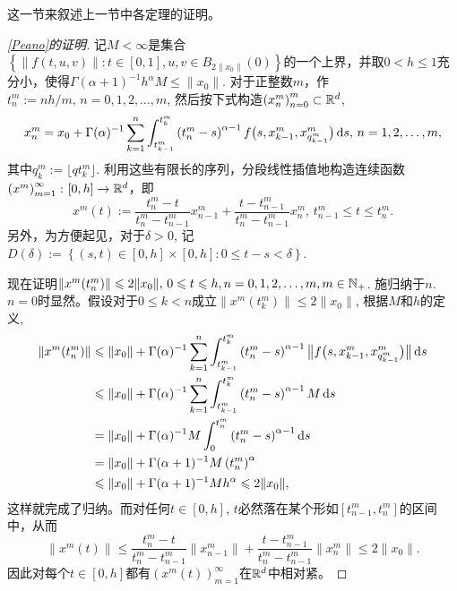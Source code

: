 这一节来叙述上一节中各定理的证明。
\begin{proof}[\cref{Peano}的证明]
    记$M<\infty$是集合$\left\{\left\|f(t,u,v)\right\|\colon t\in [0,1], u,v\in B_{2\|x_0\|}(0)\right\}$的一个上界，并取$0<h\leqslant 1$充分小，使得$\Gamma(\alpha + 1)^{-1} h^\alpha M \leqslant \|x_0\|$. 对于正整数$m$，作$t^m_{n}:=nh/m,\,n=0,1,2,\dots,m$, 然后按下式构造$\left(x^m_{n}\right)_{n=0}^m\subset \mathbb{R}^d$,
    \begin{equation*}
        x^m_{n}=x_0+\Gamma(\alpha)^{-1}\sum_{k=1}^n\int_{t^m_{k-1}}^{t^m_k}\left(t^m_n-s\right)^{\alpha-1}f\bigl(s,x^m_{k-1},x^m_{q^m_{k-1}}\bigr)\mathop{}\!\mathrm{d} s,\,n=1,2,\dots,m,
    \end{equation*}
    其中$q^m_{k}:=\lfloor qt^m_k \rfloor$. 利用这些有限长的序列，分段线性插值地构造连续函数$\left(x^m\right)_{m=1}^\infty\colon[0,h]\to \mathbb{R}^d$，即
    \begin{equation*}
        x^m(t):=\frac{t^m_n-t}{t^m_n-t^m_{n-1}}x^m_{n-1}+\frac{t-t^m_{n-1}}{t^m_n-t^m_{n-1}}x^m_{n},\,t^m_{n-1}\leqslant t\leqslant t^m_n.
    \end{equation*}
    另外，为方便起见，对于$\delta>0$, 记$D(\delta):=\left\{(s,t)\in [0,h]\times [0,h]\colon 0\leqslant t-s<\delta\right\}$.

    现在证明$\|x^m(t^m_n)\|\leqslant 2\|x_0\|,\,0\leqslant t\leqslant h,n=0,1,2,\dots,m,m\in \mathbb{N_+}$. 施归纳于$n$. $n=0$时显然。假设对于$0\leqslant k<n$成立$\|x^m(t^m_k)\|\leqslant 2\|x_0\|$, 根据$M$和$h$的定义,
    \begin{align*}
        \left\|x^m(t^m_n)\right\|&\leqslant \|x_0\|+\Gamma(\alpha)^{-1}\sum_{k=1}^{n}\int_{t^m_{k-1}}^{t^m_k} \left(t^m_n-s\right)^{\alpha-1} \bigl\|f\bigl(s,x^m_{k-1},x^m_{q^m_{k-1}}\bigr)\bigr\| \mathop{}\!\mathrm{d} s
        \\ &\leqslant \|x_0\|+\Gamma(\alpha)^{-1} \sum_{k=1}^{n}\int_{t^m_{k-1}}^{t^m_k} \left(t^m_n-s\right)^{\alpha-1} M \mathop{}\!\mathrm{d} s
        \\ &= \|x_0\|+\Gamma(\alpha)^{-1} M \int_{0}^{t^m_n} \left(t^m_n-s\right)^{\alpha-1} \mathop{}\!\mathrm{d} s
        \\ &= \|x_0\|+\Gamma(\alpha+1)^{-1} M \left(t^m_n\right)^\alpha
        \\ &\leqslant \|x_0\|+\Gamma(\alpha+1)^{-1} M h^\alpha
        \leqslant 2\|x_0\|,
    \end{align*}
    这样就完成了归纳。而对任何$t\in [0,h]$, $t$必然落在某个形如$\left[t^m_{n-1},t^m_n\right]$的区间中，从而
    \begin{equation*}
        \left\|x^m(t)\right\|\leqslant \frac{t^m_n-t}{t^m_n-t^m_{n-1}}\left\|x^m_{n-1}\right\|+\frac{t-t^m_{n-1}}{t^m_n-t^m_{n-1}}\left\|x^m_{n}\right\|\leqslant 2\|x_0\|.
    \end{equation*}
    因此对每个$t\in [0,h]$都有$\left(x^m(t)\right)_{m=1}^\infty$在$\mathbb{R}^d$中相对紧。


\end{proof}
